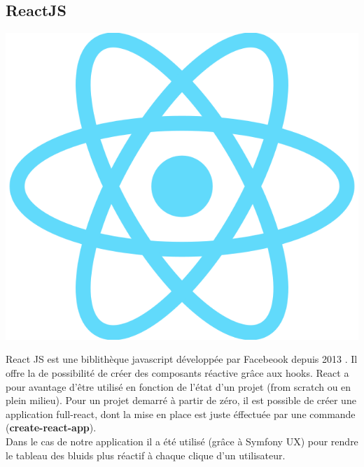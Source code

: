 		\subsection{ReactJS}
			\begin{center}
				\includegraphics[scale=0.4]{chap_3/react.png}
				\label{ReactJS}
				\cite{react_js}
			\end{center}
			React JS est une biblithèque javascript développée par Facebeook depuis 2013 \cite{react_wiki}. Il offre la de possibilité de créer des composants réactive grâce aux hooks. React a pour avantage d'être utilisé en fonction de l'état d'un projet (from scratch ou en plein milieu). Pour un projet demarré à partir de zéro, il est possible de créer une application full-react, dont la mise en place est juste éffectuée par une commande (\textbf{create-react-app}).\\
			Dans le cas de notre application il a été utilisé (grâce à Symfony UX) pour rendre le tableau des bluids plus réactif à chaque clique d'un utilisateur.	